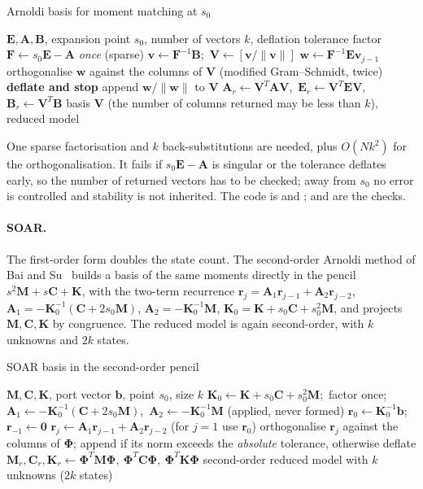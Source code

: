 \begin{algbox}{Arnoldi basis for moment matching at $s_0$}
\begin{pseudo}
\Require $\bm E,\bm A,\bm B$, expansion point $s_0$, number of vectors $k$, deflation tolerance
\State factor $\bm F\gets s_0\bm E-\bm A$ \emph{once} (sparse)
\State $\bm v\gets\bm F^{-1}\bm B$;\ $\bm V\gets[\bm v/\|\bm v\|]$
  \State $\bm w\gets\bm F^{-1}\bm E\bm v_{j-1}$ 
  \State orthogonalise $\bm w$ against the columns of $\bm V$ (modified Gram--Schmidt, twice)
   \textbf{deflate and stop} \Else{} append $\bm w/\|\bm w\|$ to $\bm V$ \EndIf
\EndFor
\State $\bm A_r\gets\bm V^T\bm A\bm V$,\ $\bm E_r\gets\bm V^T\bm E\bm V$,\ $\bm B_r\gets\bm V^T\bm B$ 
\Ensure basis $\bm V$ (the number of columns returned may be less than $k$), reduced model
\end{pseudo}
\end{algbox}

One sparse factorisation and $k$ back-substitutions are needed, plus $O(Nk^2)$ for the orthogonalisation. It fails if $s_0\bm E-\bm A$ is singular or the tolerance deflates early, so the number of returned vectors has to be checked; away from $s_0$ no error is controlled and stability is not inherited. The code is  and ;  and  are the checks.

\paragraph{SOAR.}
The first-order form doubles the state count. The second-order Arnoldi method of Bai and Su~\cite{bai2005soar} builds a basis of the same moments directly in the pencil $s^2\bm M+s\bm C+\bm K$, with the two-term recurrence $\bm r_j=\bm A_1\bm r_{j-1}+\bm A_2\bm r_{j-2}$, $\bm A_1=-\bm K_0^{-1}(\bm C+2s_0\bm M)$, $\bm A_2=-\bm K_0^{-1}\bm M$, $\bm K_0=\bm K+s_0\bm C+s_0^2\bm M$, and projects $\bm M,\bm C,\bm K$ by congruence. The reduced model is again second-order, with $k$ unknowns and $2k$ states.

\begin{algbox}{SOAR basis in the second-order pencil}
\begin{pseudo}
\Require $\bm M,\bm C,\bm K$, port vector $\bm b$, point $s_0$, size $k$
\State $\bm K_0\gets\bm K+s_0\bm C+s_0^2\bm M$;\ factor once;\ $\bm A_1\gets-\bm K_0^{-1}(\bm C+2s_0\bm M)$,\ $\bm A_2\gets-\bm K_0^{-1}\bm M$ (applied, never formed)
\State $\bm r_0\gets\bm K_0^{-1}\bm b$;\ $\bm r_{-1}\gets\bm 0$
  \State $\bm r_j\gets\bm A_1\bm r_{j-1}+\bm A_2\bm r_{j-2}$ (for $j=1$ use $\bm r_0$)
  \State orthogonalise $\bm r_j$ against the columns of $\bm\Phi$; append if its norm exceeds the \emph{absolute} tolerance, otherwise deflate
\EndFor
\State $\bm M_r,\bm C_r,\bm K_r\gets\bm\Phi^T\bm M\bm\Phi,\ \bm\Phi^T\bm C\bm\Phi,\ \bm\Phi^T\bm K\bm\Phi$ 
\Ensure second-order reduced model with $k$ unknowns ($2k$ states)
\end{pseudo}
\end{algbox}

